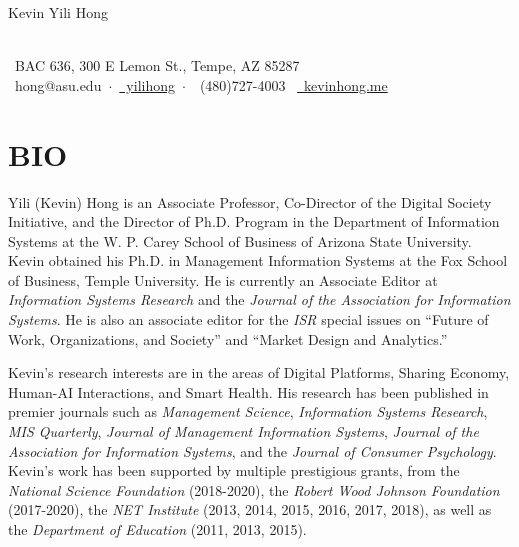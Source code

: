 \documentclass[paper=letter,fontsize=10pt]{scrartcl} %
\newcommand{\MyName}[1]{ %
		\LARGE \usefont{T1}{lmr}{m}{sc} #1 %
		\par \normalsize \fontshape{sc}}
\newcommand{\MySlogan}[1]{ %
		\small \usefont{T1}{lmtt}{m}{n}\hfill #1
		\par \normalsize \normalfont}
\newcommand{\NewPart}[2]{\section*{{#1} #2}}
\begin{document}

\begin{flushright}
\MyName{Kevin Yili Hong}
\end{flushright}
\MySlogan{\vspace{-0.5in}
\begin{flushright}~\\\faMapMarker~BAC 636, 300 E Lemon St., Tempe, AZ 85287 \\
\faEnvelope~hong@asu.edu~$\cdot$~\href{https://www.linkedin.com/in/yilihong/}{\faLinkedinSquare~yilihong}~$\cdot$~\faPhone~(480)727-4003~
\href{http://kevinhong.me}{\faInternetExplorer~kevinhong.me}
\end{flushright}}


\NewPart{BIO}{}
\bigskip

Yili (Kevin) Hong is an Associate Professor, Co-Director of the Digital Society Initiative, and the Director of Ph.D. Program in the Department of Information Systems at the W. P. Carey School of Business of Arizona State University. Kevin obtained his Ph.D. in Management Information Systems at the Fox School of Business, Temple University. He is currently an Associate Editor at \emph{Information Systems Research} and the \emph{Journal of the Association for Information Systems}. He is also an associate editor for the \emph{ISR} special issues on “Future of Work, Organizations, and Society” and “Market Design and Analytics.”
\bigskip

Kevin’s research interests are in the areas of Digital Platforms, Sharing Economy, Human-AI Interactions, and Smart Health. His research has been published in premier journals such as \emph{Management Science}, \emph{Information Systems Research}, \emph{MIS Quarterly}, \emph{Journal of Management Information Systems}, \emph{Journal of the Association for Information Systems}, and the \emph{Journal of Consumer Psychology}. Kevin’s work has been supported by multiple prestigious grants, from the \emph{National Science Foundation} (2018-2020), the \emph{Robert Wood Johnson Foundation} (2017-2020), the \emph{NET Institute} (2013, 2014, 2015, 2016, 2017, 2018), as well as the \emph{Department of Education} (2011, 2013, 2015).
\bigskip
\end{document}

